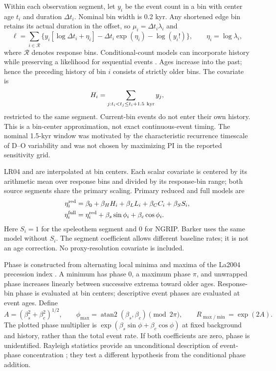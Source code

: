 \documentclass[11pt]{article}
\begin{document}
Within each observation segment, let $y_i$ be the event count in a bin with center age $t_i$ and duration $\Delta t_i$. Nominal bin width is 0.2 kyr. Any shortened edge bin retains its actual duration in the offset, so $\mu_i=\Delta t_i\lambda_i$ and
\begin{equation}
 \ell=\sum_{i\in\mathcal R}\{y_i[\log\Delta t_i+\eta_i]-\Delta t_i\exp(\eta_i)-\log(y_i!)\},
 \qquad \eta_i=\log\lambda_i,
\end{equation}
where $\mathcal R$ denotes response bins. Conditional-count models can incorporate history while preserving a likelihood for sequential events \citep{davis2003observation,truccolo2005point}. Ages increase into the past; hence the preceding history of bin $i$ consists of strictly older bins. The covariate is
\begin{equation}
 H_i=\sum_{j:t_i<t_j\leq t_i+1.5\ {\rm kyr}}y_j,
\end{equation}
restricted to the same segment. Current-bin events do not enter their own history. This is a bin-center approximation, not exact continuous-event timing. The nominal 1.5-kyr window was motivated by the characteristic recurrence timescale of D--O variability and was not chosen by maximizing PI in the reported sensitivity grid.

LR04 and  are interpolated at bin centers. Each scalar covariate is centered by its arithmetic mean over response bins and divided by its response-bin range; both source segments share the primary scaling. Primary reduced and full models are
\begin{align}
 \eta_i^{\rm red}&=\beta_0+\beta_H H_i+\beta_L L_i+\beta_C C_i+\beta_S S_i,\\
 \eta_i^{\rm full}&=\eta_i^{\rm red}+\beta_s\sin\phi_i+\beta_c\cos\phi_i.
\end{align}
Here $S_i=1$ for the speleothem segment and 0 for NGRIP. Barker uses the same model without $S_i$. The segment coefficient allows different baseline rates; it is not an age correction. No proxy-resolution covariate is included.

Phase is constructed from alternating local minima and maxima of the La2004 precession index \citep{laskar2004long}. A minimum has phase 0, a maximum phase $\pi$, and unwrapped phase increases linearly between successive extrema toward older ages. Response-bin phase is evaluated at bin centers; descriptive event phases are evaluated at event ages. Define
\begin{equation}
 A=(\beta_s^2+\beta_c^2)^{1/2},\qquad
 \phi_{\max}=\operatorname{atan2}(\beta_s,\beta_c)\pmod{2\pi},\qquad
 R_{\max/\min}=\exp(2A).
\end{equation}
The plotted phase multiplier is $\exp(\beta_s\sin\phi+\beta_c\cos\phi)$ at fixed background and history, rather than the total event rate. If both coefficients are zero, phase is unidentified. Rayleigh statistics provide an unconditional description of event-phase concentration \citep{mardia2000directional}; they test a different hypothesis from the conditional phase addition.
\end{document}
